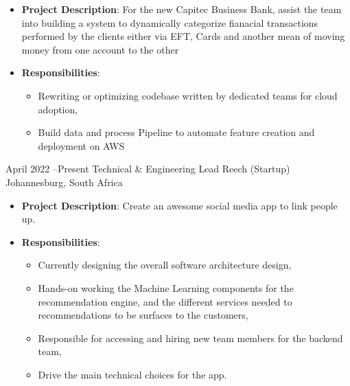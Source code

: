 \documentclass[11pt, letterpaper]{moderncv}        %
\begin{document}
{\begin{itemize}
\begin{itemize}
			\item \textbf{Project Description}: For the new Capitec Business Bank, assist the team into building a system to dynamically categorize fianacial transactions performed by the clients either via EFT, Cards and another mean of moving money from one account to the other
			\item \textbf{Responsibilities}:
			\begin{itemize}
				\item Rewriting or optimizing codebase written by dedicated teams for cloud adoption,
				\item Build data and process Pipeline to automate feature creation and deployment on AWS
			\end{itemize}
		\end{itemize}
	\end{itemize}
}

\cventry
{April 2022 --Present}
{Technical \& Engineering Lead}
{Reech (Startup)}
{Johannesburg, South Africa}
{}
{\begin{itemize}%
		\item \textbf{Project Description}: Create an awesome social media app to link people up.
		\item \textbf{Responsibilities}:
		\begin{itemize}
			\item Currently designing the overall software architecture design, 
			\item Hands-on working the Machine Learning components for the recommendation engine,  and the different services needed to recommendations to be surfaces to the customers,
			\item Responsible for accessing and hiring new team members for the backend team,
			\item Drive the main technical choices for the app.
		\end{itemize}
\end{itemize}}
\end{document}
